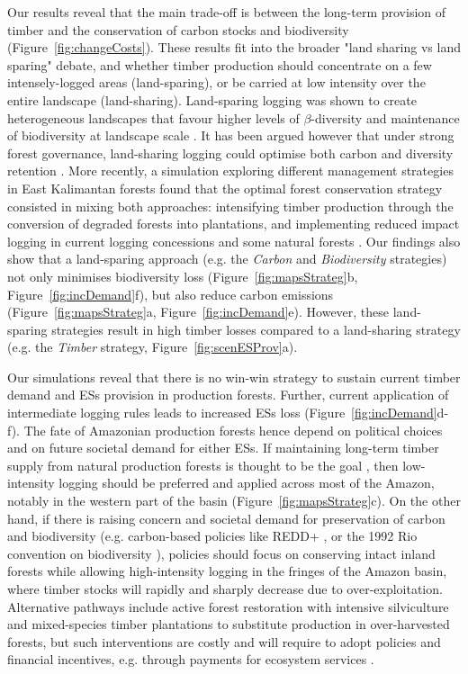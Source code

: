 \documentclass{article}
\begin{document}
Our results reveal that the main trade-off is between the long-term provision of timber and the conservation of carbon stocks and biodiversity (Figure~\ref{fig:changeCosts}). These results fit into the broader "land sharing vs land sparing" debate, and whether timber production should concentrate on a few intensely-logged areas (land-sparing), or be carried at low intensity over the entire landscape (land-sharing). 
Land-sparing logging was shown to create heterogeneous landscapes that favour higher levels of $\beta$-diversity and maintenance of biodiversity at landscape scale \cite{DeCastroSolar2015,Edwards2014}. 
It has been argued however that under strong forest governance, land-sharing logging could optimise both carbon and diversity retention \cite{Griscom2018}. 
More recently, a simulation exploring different management strategies in East Kalimantan forests found that the optimal forest conservation strategy consisted in mixing both approaches: intensifying timber production through the conversion of degraded forests into plantations, and implementing reduced impact logging in current logging concessions and some natural forests \cite{Runting2018}. 
Our findings also show that a land-sparing approach (e.g. the \textit{Carbon} and \textit{Biodiversity} strategies) not only minimises biodiversity loss (Figure~\ref{fig:mapsStrateg}b, Figure~\ref{fig:incDemand}f), but also reduce carbon emissions (Figure~\ref{fig:mapsStrateg}a, Figure~\ref{fig:incDemand}e). 
However, these land-sparing strategies result in high timber losses compared to a land-sharing strategy (e.g. the \textit{Timber} strategy, Figure~\ref{fig:scenESProv}a). 

Our simulations reveal that there is no win-win strategy to sustain current timber demand and ESs provision in production forests. Further, current application of intermediate logging rules leads to increased ESs loss (Figure~\ref{fig:incDemand}d-f). The fate of Amazonian production forests hence depend on political choices and on future societal demand for either ESs. If maintaining long-term timber supply from natural production forests is thought to be the goal \cite{Zarin2007}, then low-intensity logging should be preferred and applied across most of the Amazon, notably in the western part of the basin (Figure~\ref{fig:mapsStrateg}c).
On the other hand, if there is raising concern and societal demand for preservation of carbon and biodiversity (e.g. carbon-based policies like REDD+ \cite{Stickler2009}, or the 1992 Rio convention on biodiversity \cite{Barton1992}), policies should focus on conserving intact inland forests while allowing high-intensity logging in the fringes of the Amazon basin, where timber stocks will rapidly and sharply decrease due to over-exploitation. Alternative pathways include active forest restoration with intensive silviculture and mixed-species timber plantations \cite{Lamb2005} to substitute production in over-harvested forests, but such interventions are costly and will require to adopt policies and financial incentives, e.g. through payments for ecosystem services \cite{Salzman2018}.
\end{document}
